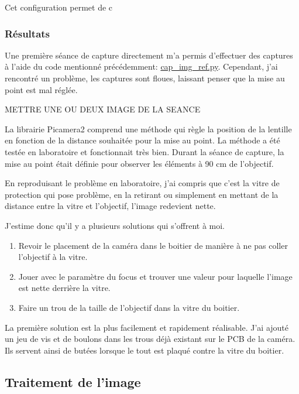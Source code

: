 Cet configuration permet de c
\subsubsection{Résultats}
Une première séance de capture directement m'a permis d'effectuer des captures à l'aide du code mentionné précédemment: \underline{cap\_img\_ref.py}. Cependant, j'ai rencontré un problème, les captures sont floues, laissant penser que la mise au point est mal réglée.

METTRE UNE OU DEUX IMAGE DE LA SEANCE

La librairie Picamera2 \cite{picamera2} comprend une méthode qui règle la position de la lentille en fonction de la distance souhaitée pour la mise au point. La méthode a été testée en laboratoire et fonctionnait très bien. Durant la séance de capture,
la mise au point était définie pour observer les éléments à 90 \si{\centi\meter} de l'objectif.

En reproduisant le problème en laboratoire, j'ai compris que c'est la vitre de protection qui pose problème, en la retirant ou simplement en mettant de la distance entre la vitre et l'objectif, l'image redevient nette.

J'estime donc qu'il y a plusieurs solutions qui s'offrent à moi.
\begin{enumerate}
    \item Revoir le placement de la caméra dans le boitier de manière à ne pas coller l'objectif à la vitre.
    \item Jouer avec le paramètre du focus et trouver une valeur pour laquelle l'image est nette derrière la vitre.
    \item Faire un trou de la taille de l'objectif dans la vitre du boitier.
\end{enumerate}

La première solution est la plus facilement et rapidement réalisable. J'ai ajouté un jeu de vis et de boulons dans les trous déjà existant sur le PCB de la caméra.
Ils servent ainsi de butées lorsque le tout est plaqué contre la vitre du boitier.
\newpage

\subsection{Traitement de l'image}
